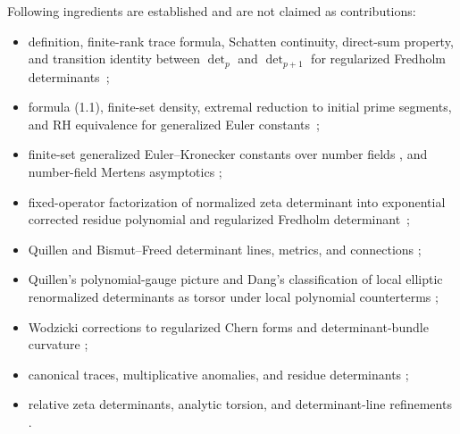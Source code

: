 \documentclass[11pt]{article}
\theoremstyle{definition}
\theoremstyle{remark}
\begin{document}
Following ingredients are established and are not claimed as contributions:
\begin{itemize}
\setlength{\itemsep}{0.35em}
\item definition, finite-rank trace formula, Schatten continuity, direct-sum property, and
      transition identity between $\det_p$ and $\det_{p+1}$ for regularized Fredholm
      determinants~\cite{Simon2005};
\item formula (1.1), finite-set density, extremal reduction to initial prime segments, and RH
      equivalence for generalized Euler constants~\cite{DiamondFord2008};
\item finite-set generalized Euler--Kronecker constants over number fields
      \cite{KandhilLunia2024}, and number-field Mertens asymptotics
      \cite{Rosen1999,GarciaLee2022};
\item fixed-operator factorization of normalized zeta determinant into exponential corrected
      residue polynomial and regularized Fredholm determinant~\cite{HartmannLesch2022};
\item Quillen and Bismut--Freed determinant lines, metrics, and connections
      \cite{Quillen1985,BismutFreed1986};
\item Quillen's polynomial-gauge picture and Dang's classification of local elliptic
      renormalized determinants as torsor under local polynomial counterterms
      \cite{Dang2022};
\item Wodzicki corrections to regularized Chern forms and determinant-bundle curvature
      \cite{PaychaRosenberg2000};
\item canonical traces, multiplicative anomalies, and residue determinants
      \cite{KontsevichVishik1994,Scott2005};
\item relative zeta determinants, analytic torsion, and determinant-line refinements
      \cite{Scott1999,Muller1998,DaiFreed1994,BravermanKappeler2007}.
\end{itemize}
\end{document}
